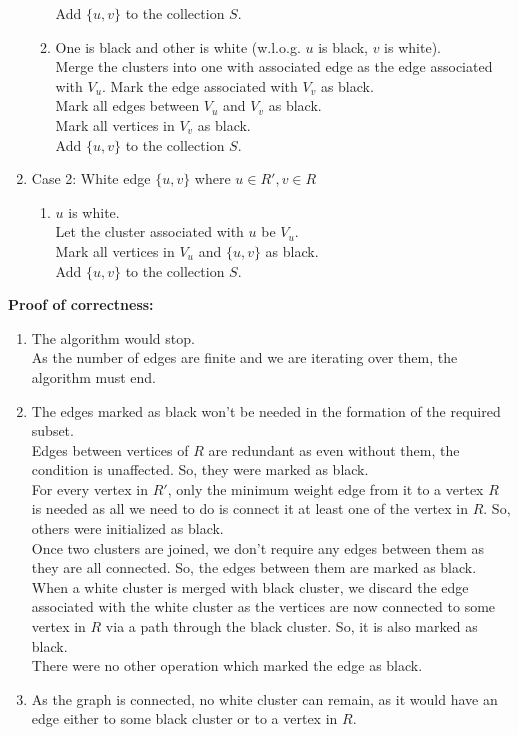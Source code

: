 \documentclass[11pt, fleqn]{article}
\begin{document}
\begin{enumerate}
\begin{enumerate}
        Add $\{u, v\}$ to the collection $S$.
        \item One is black and other is white (w.l.o.g. $u$ is black, $v$ is white).\\
        Merge the clusters into one with associated edge as the edge associated with $V_u$. Mark the edge associated with $V_v$ as black. \\
        Mark all edges between $V_u$ and $V_v$ as black.\\
        Mark all vertices in $V_v$ as black.\\
        Add $\{u, v\}$ to the collection $S$.
    \end{enumerate}
    \item Case 2: White edge $\{u, v\}$ where $u \in R', v \in R$
    \begin{enumerate}
        \item $u$ is white.\\
        Let the cluster associated with $u$ be $V_u$.\\
        Mark all vertices in $V_u$ and $\{u, v\}$ as black.\\
        Add $\{u, v\}$ to the collection $S$.
    \end{enumerate}
\end{enumerate}
\textbf{Proof of correctness:}
\begin{enumerate}
    \item The algorithm would stop.\\
    As the number of edges are finite and we are iterating over them, the algorithm must end.
    \item The edges marked as black won't be needed in the formation of the required subset.\\
    Edges between vertices of $R$ are redundant as even without them, the condition is unaffected. So, they were marked as black.\\
    For every vertex in $R'$, only the minimum weight edge from it to a vertex $R$ is needed as all we need to do is connect it at least one of the vertex in $R$. So, others were initialized as black.\\
    Once two clusters are joined, we don't require any edges between them as they are all connected. So, the edges between them are marked as black.\\
    When a white cluster is merged with black cluster, we discard the edge associated with the white cluster as the vertices are now connected to some vertex in $R$ via a path through the black cluster. So, it is also marked as black.\\
    There were no other operation which marked the edge as black.
    \item As the graph is connected, no white cluster can remain, as it would have an edge either to some black cluster or to a vertex in $R$.
\end{enumerate}
\end{document}
